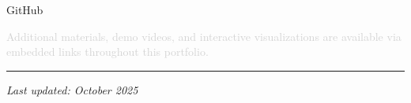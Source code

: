 \begin{center}
\begin{minipage}[t]{0.45\textwidth}
  \vspace{0.3em}
  
  {\small GitHub}
\end{minipage}

\vspace{2em}

\textcolor{LightGray}{\footnotesize Additional materials, demo videos, and interactive visualizations are available via embedded links throughout this portfolio.}

\vspace{1em}

\textcolor{Accent}{\rule{0.5\linewidth}{1pt}}

\vspace{1em}

{\footnotesize \textit{Last updated: October 2025}}

\end{center}

\vspace*{\fill}

